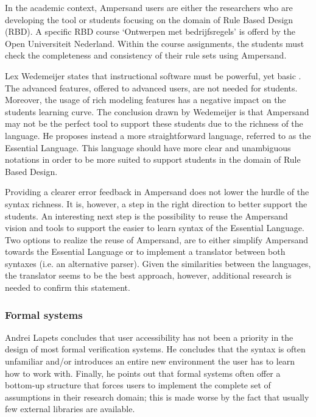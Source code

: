 %
In the academic context, Ampersand users are either the researchers who are developing the tool or students focusing on the domain of Rule Based Design (RBD).
A specific RBD course `Ontwerpen met bedrijfsregels' is offerd by the Open Universiteit Nederland.
Within the course assignments, the students must check the completeness and consistency of their rule sets using Ampersand. 

Lex Wedemeijer states that instructional software must be powerful, yet basic .
The advanced features, offered to advanced users, are not needed for students.
Moreover, the usage of rich modeling features has a negative impact on the students learning curve.
The conclusion drawn by Wedemeijer is that Ampersand may not be the perfect tool to support these students due to the richness of the language.
He proposes instead a more straightforward language, referred to as the Essential Language.
This language should have more clear and unambiguous notations in order to be more suited to support students in the domain of Rule Based Design.

Providing a clearer error feedback in Ampersand does not lower the hurdle of the syntax richness.
It is, however, a step in the right direction to better support the students. 
An interesting next step is the possibility to reuse the Ampersand vision and tools to support the easier to learn syntax of the Essential Language.
Two options to realize the reuse of Ampersand, are to either simplify Ampersand towards the Essential Language or to implement a translator between both syntaxes (i.e. an alternative parser).
Given the similarities between the languages, the translator seems to be the best approach, however, additional research is needed to confirm this statement.

\subsubsection{Formal systems}
Andrei Lapets  concludes that user accessibility has not been a priority in the design of most formal verification systems.
He concludes that the syntax is often unfamiliar and/or introduces an entire new environment the user has to learn how to work with.
Finally, he points out that formal systems often offer a bottom-up structure that forces users to implement the complete set of assumptions in their research domain; this is made worse by the fact that usually few external libraries are available.

